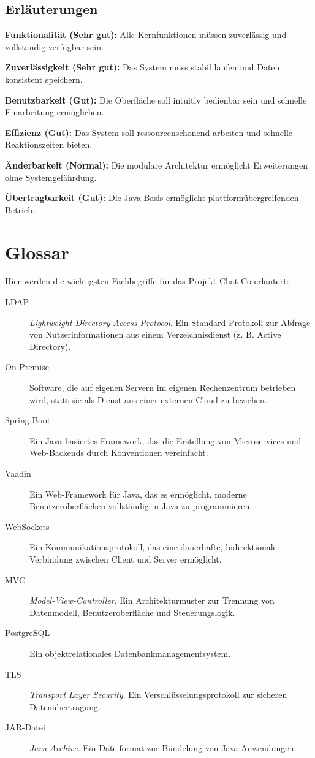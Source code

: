 \documentclass[12pt,a4paper]{extarticle}
\begin{document}
\subsection*{Erläuterungen}

\textbf{Funktionalität (Sehr gut):}  
Alle Kernfunktionen müssen zuverlässig und vollständig verfügbar sein.

\textbf{Zuverlässigkeit (Sehr gut):}  
Das System muss stabil laufen und Daten konsistent speichern.

\textbf{Benutzbarkeit (Gut):}  
Die Oberfläche soll intuitiv bedienbar sein und schnelle Einarbeitung ermöglichen.

\textbf{Effizienz (Gut):}  
Das System soll ressourcenschonend arbeiten und schnelle Reaktionszeiten bieten.

\textbf{Änderbarkeit (Normal):}  
Die modulare Architektur ermöglicht Erweiterungen ohne Systemgefährdung.

\textbf{Übertragbarkeit (Gut):}  
Die Java-Basis ermöglicht plattformübergreifenden Betrieb.


\newpage
\section{Glossar}

Hier werden die wichtigsten Fachbegriffe für das Projekt Chat-Co erläutert:

\begin{description}
\item[LDAP] \textit{Lightweight Directory Access Protocol}. Ein Standard-Protokoll zur Abfrage von Nutzerinformationen aus einem Verzeichnisdienst (z. B. Active Directory).
\item[On-Premise] Software, die auf eigenen Servern im eigenen Rechenzentrum betrieben wird, statt sie als Dienst aus einer externen Cloud zu beziehen.
\item[Spring Boot] Ein Java-basiertes Framework, das die Erstellung von Microservices und Web-Backends durch Konventionen vereinfacht.
\item[Vaadin] Ein Web-Framework für Java, das es ermöglicht, moderne Benutzeroberflächen vollständig in Java zu programmieren.
\item[WebSockets] Ein Kommunikationsprotokoll, das eine dauerhafte, bidirektionale Verbindung zwischen Client und Server ermöglicht.
\item[MVC] \textit{Model-View-Controller}. Ein Architekturmuster zur Trennung von Datenmodell, Benutzeroberfläche und Steuerungslogik.
\item[PostgreSQL] Ein objektrelationales Datenbankmanagementsystem.
\item[TLS] \textit{Transport Layer Security}. Ein Verschlüsselungsprotokoll zur sicheren Datenübertragung.
\item[JAR-Datei] \textit{Java Archive}. Ein Dateiformat zur Bündelung von Java-Anwendungen.
\end{description}
\end{document}
